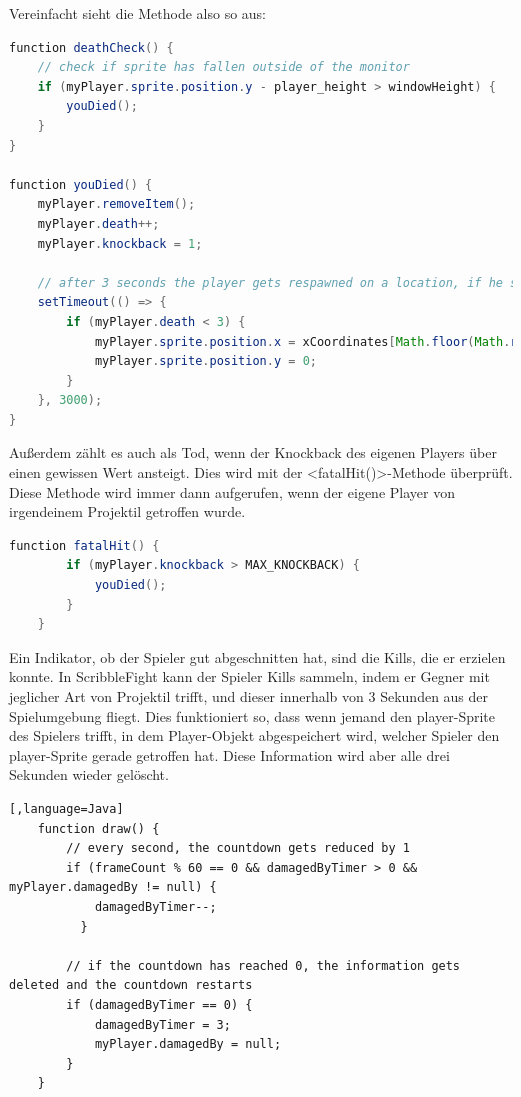 Vereinfacht sieht die Methode also so aus:

\begin{lstlisting}[caption=Überprüfung nach Toden,language=Java,label=lst:impl:deathCheck]
function deathCheck() {
    // check if sprite has fallen outside of the monitor
    if (myPlayer.sprite.position.y - player_height > windowHeight) {
        youDied();
    }
}

function youDied() {
    myPlayer.removeItem();
    myPlayer.death++;
    myPlayer.knockback = 1;

    // after 3 seconds the player gets respawned on a location, if he still has at least one live left
    setTimeout(() => {
        if (myPlayer.death < 3) {
            myPlayer.sprite.position.x = xCoordinates[Math.floor(Math.random() * xCoordinates.length)];
            myPlayer.sprite.position.y = 0;
        }
    }, 3000);
}
\end{lstlisting}

Außerdem zählt es auch als Tod, wenn der Knockback des eigenen Players über einen gewissen Wert ansteigt. Dies wird mit der <fatalHit()>-Methode überprüft.
Diese Methode wird immer dann aufgerufen, wenn der eigene Player von irgendeinem Projektil getroffen wurde.
\begin{lstlisting}[caption=Fatal Hit,language=Java,label=lst:impl:fatalHit]
    function fatalHit() {
        if (myPlayer.knockback > MAX_KNOCKBACK) {
            youDied();
        }
    } 
\end{lstlisting}
Ein Indikator, ob der Spieler gut abgeschnitten hat, sind die Kills, die er erzielen konnte.
In ScribbleFight kann der Spieler Kills sammeln, indem er Gegner mit jeglicher Art von Projektil trifft, und dieser innerhalb von 3 Sekunden aus der Spielumgebung fliegt.
Dies funktioniert so, dass wenn jemand den player-Sprite des Spielers trifft, in dem Player-Objekt abgespeichert wird, welcher Spieler den player-Sprite gerade getroffen hat.
Diese Information wird aber alle drei Sekunden wieder gelöscht.

\begin{lstlisting}[,language=Java]
    function draw() {
        // every second, the countdown gets reduced by 1
        if (frameCount % 60 == 0 && damagedByTimer > 0 && myPlayer.damagedBy != null) {
            damagedByTimer--;
          }
      
        // if the countdown has reached 0, the information gets deleted and the countdown restarts
        if (damagedByTimer == 0) {
            damagedByTimer = 3;
            myPlayer.damagedBy = null;
        }
    }
   
\end{lstlisting}


